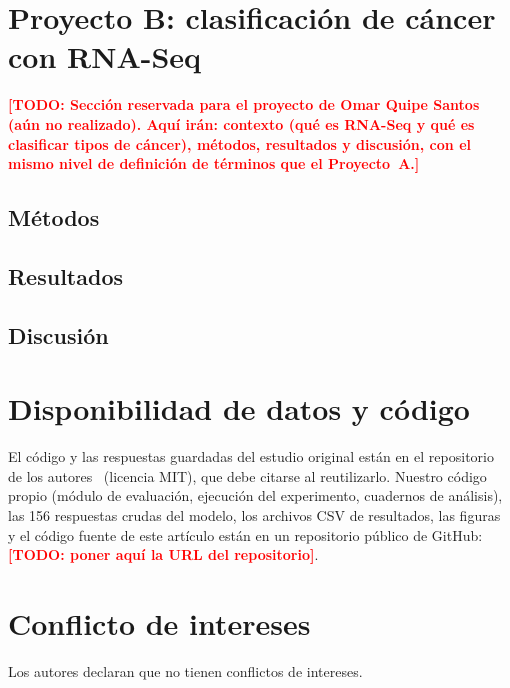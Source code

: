 \documentclass[unnumsec,webpdf,contemporary,large]{oup-authoring-template}
\newcommand{\TODO}[1]{\textcolor{red}{\textbf{[TODO: #1]}}}
\begin{document}
\section{Proyecto B: clasificación de cáncer con RNA-Seq}\label{sec:B}

\TODO{Sección reservada para el proyecto de Omar Quipe Santos (aún no realizado). Aquí irán: contexto (qué es RNA-Seq y qué es clasificar tipos de cáncer), métodos, resultados y discusión, con el mismo nivel de definición de términos que el Proyecto~A.}

\subsection{Métodos}
\vspace{3.5cm}

\subsection{Resultados}
\vspace{3.5cm}

\subsection{Discusión}
\vspace{3.5cm}

\section{Disponibilidad de datos y código}
El código y las respuestas guardadas del estudio original están en el repositorio de los autores~\cite{repo_saucerman} (licencia MIT), que debe citarse al reutilizarlo. Nuestro código propio (módulo de evaluación, ejecución del experimento, cuadernos de análisis), las 156 respuestas crudas del modelo, los archivos CSV de resultados, las figuras y el código fuente de este artículo están en un repositorio público de GitHub: \TODO{poner aquí la URL del repositorio}.

\section{Conflicto de intereses}
Los autores declaran que no tienen conflictos de intereses.



\end{document}
